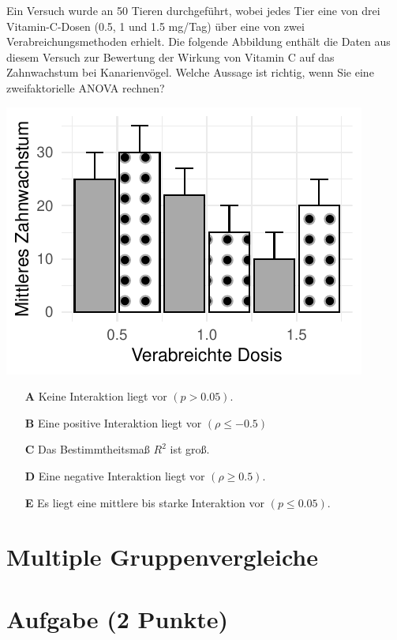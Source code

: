 \documentclass[a4paper, 9pt]{scrartcl}\usepackage[]{graphicx}\usepackage[]{xcolor}
\makeatletter
\def\maxwidth{ %
  \ifdim\Gin@nat@width>\linewidth
    \linewidth
  \else
    \Gin@nat@width
  \fi
}
\makeatother
\begin{document}
Ein Versuch wurde an 50 Tieren durchgeführt, wobei jedes Tier eine von drei Vitamin-C-Dosen (0.5, 1 und 1.5 mg/Tag) über eine von zwei Verabreichungsmethoden erhielt. Die folgende Abbildung enthält die Daten aus diesem Versuch zur Bewertung der Wirkung von Vitamin C auf das Zahnwachstum bei Kanarienvögel.  Welche Aussage ist richtig, wenn Sie eine zweifaktorielle ANOVA rechnen?



{\centering \includegraphics[width=\maxwidth]{img/mc-anova-02-a-1} 

}







\begin{enumerate}
\item [\textbf{A} \msquare] Keine Interaktion liegt vor $(p > 0.05)$.
\item [\textbf{B} \msquare] Eine positive Interaktion liegt vor $(\rho \leq -0.5)$ 
\item [\textbf{C} \msquare] Das Bestimmtheitsmaß $R^2$ ist groß.
\item [\textbf{D} \msquare] Eine negative Interaktion liegt vor $(\rho \geq 0.5)$.
\item [\textbf{E} \msquare] Es liegt eine mittlere bis starke Interaktion vor $(p \leq 0.05)$.
\end{enumerate}
\section*{Multiple Gruppenvergleiche} 

\section{Aufgabe \hfill (2 Punkte)}
\end{document}
